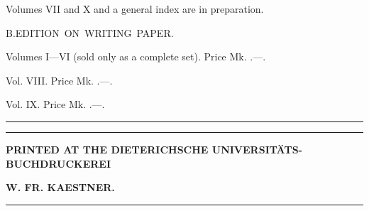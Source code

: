 \par\medskip\noindent Volumes VII and X and a general index are in preparation.
\begin{center}
{\fontsize{13}{16}\selectfont\mbox{\llap{\raisebox{.4ex}{\fontsize{5}{6}\selectfont,}\hspace{2.5em}}B.\quad EDITION ON WRITING PAPER.}}
\end{center}
\noindent Volumes I---VI (sold only as a complete set). Price Mk. {\fontsize{8}{10}.---.}\par
\noindent Vol. VIII. Price Mk. {\fontsize{8}{10}.---.}\par
\noindent Vol. IX. Price Mk. {\fontsize{8}{10}.---.}\par
\begin{center}\rule{3cm}{.3pt}\end{center}
\par\noindent{}
\vfill
\begin{center}
\rule{8cm}{.3pt}\par\bigskip
{\fontsize{14}{18}\selectfont{}}\par\bigskip
{\fontsize{8}{11}\selectfont\textbf{PRINTED AT THE DIETERICHSCHE UNIVERSITÄTS-BUCHDRUCKEREI}}\par\medskip
{\fontsize{8}{11}\selectfont\textbf{W. FR. KAESTNER.}}\par\bigskip
\rule{8cm}{.3pt}
\end{center}
\endgroup
